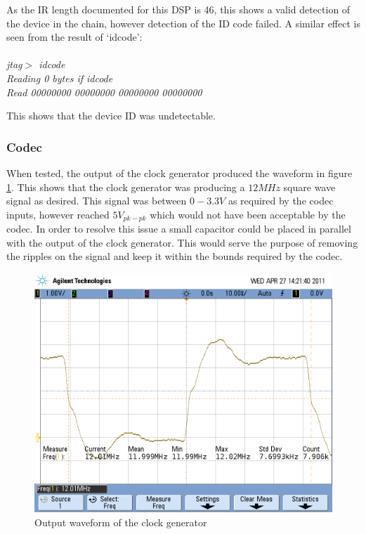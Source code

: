 \noindent As the IR length documented for this DSP is 46, this shows a valid detection of the device in the chain, however detection of the ID code failed.
A similar effect is seen from the result of `idcode':
\\
\\
\emph{
\indent jtag$>$ idcode	\\
\indent Reading 0 bytes if idcode	\\
\indent Read 00000000 00000000 00000000 00000000	\\
}

\noindent This shows that the device ID was undetectable.
\subsubsection{Codec}
When tested, the output of the clock generator produced the waveform in figure \ref{fig:codec12Mclk}.
This shows that the clock generator was producing a $12MHz$ square wave signal as desired.
This signal was between $0-3.3V$ as required by the codec inputs, however reached $5V_{pk-pk}$ which would not have been acceptable by the codec.
In order to resolve this issue a small capacitor could be placed in parallel with the output of the clock generator.
This would serve the purpose of removing the ripples on the signal and keep it within the bounds required by the codec.

\begin{figure}[H]
	\centering
	\includegraphics[width=\textwidth]{./img/codec_12M_clk.png}
	\caption{Output waveform of the clock generator}
	\label{fig:codec12Mclk}
\end{figure}

